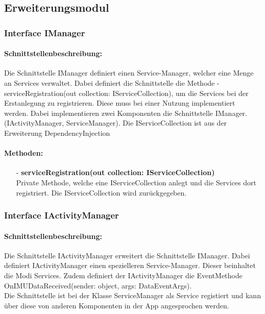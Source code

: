 \documentclass[a4paper,12pt]{article}
\begin{document}
\subsection{Erweiterungsmodul}
	\subsubsection{Interface IManager}
	\paragraph{Schnittstellenbeschreibung:}
	Die Schnittstelle IManager definiert einen Service-Manager, welcher eine Menge an Services verwaltet. Dabei definiert die Schnittstelle die Methode -serviceRegistration(out collection: IServiceCollection), um die Services bei der Erstanlegung zu registrieren. Diese muss bei einer Nutzung implementiert werden. Dabei implementieren zwei Komponenten die Schnittstelle IManager. (IActivityManager, ServiceManager). Die IServiceCollection ist aus der Erweiterung \Gls{DependencyInjection}
	
	\paragraph{Methoden:}
	\begin{itemize}
		\item[-] \textbf{serviceRegistration(out collection: IServiceCollection)}\\Private Methode, welche eine IServiceCollection anlegt und die Services dort registriert. Die IServiceCollection wird zurückgegeben. 
	\end{itemize}
	
	\subsubsection{Interface IActivityManager}
	\paragraph{Schnittstellenbeschreibung:}
	Die Schnittstelle IActivityManager erweitert die Schnittstelle IManager. Dabei definiert IActivityManager einen spezielleren Service-Manager. Dieser beinhaltet die Modi Services. Zudem definiert der IActivityManager die EventMethode OnIMUDataReceived(sender: object, args: DataEventArgs).\\
	Die Schnittstelle ist bei der Klasse ServiceManager als Service registiert und kann über diese von anderen Komponenten in der App angesprochen werden.
	
\end{document}
